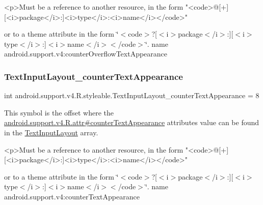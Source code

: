 \begin{DoxyVerb}      <p>Must be a reference to another resource, in the form "<code>@[+][<i>package</i>:]<i>type</i>:<i>name</i></code>"
\end{DoxyVerb}
 or to a theme attribute in the form \char`\"{}$<$code$>$?\mbox{[}$<$i$>$package$<$/i$>$\+:\mbox{]}\mbox{[}$<$i$>$type$<$/i$>$\+:\mbox{]}$<$i$>$name$<$/i$>$$<$/code$>$\char`\"{}.  name android.\+support.\+v4\+:counter\+Overflow\+Text\+Appearance \mbox{\label{classandroid_1_1support_1_1v4_1_1R_1_1styleable_aeb2a80f0f76cdaa1ff3b2b05d42b6356}} 
\subsubsection{\texorpdfstring{Text\+Input\+Layout\+\_\+counter\+Text\+Appearance}{TextInputLayout\_counterTextAppearance}}
{\footnotesize\ttfamily int android.\+support.\+v4.\+R.\+styleable.\+Text\+Input\+Layout\+\_\+counter\+Text\+Appearance = 8\hspace{0.3cm}{\ttfamily [static]}}

This symbol is the offset where the \hyperlink{classandroid_1_1support_1_1v4_1_1R_1_1attr_acb70339edeae49ae1b37939e05cf1d9a}{android.\+support.\+v4.\+R.\+attr\#counter\+Text\+Appearance} attribute\textquotesingle{}s value can be found in the \hyperlink{classandroid_1_1support_1_1v4_1_1R_1_1styleable_a86943debf88d7a9dc4c0627a8546913d}{Text\+Input\+Layout} array.

\begin{DoxyVerb}      <p>Must be a reference to another resource, in the form "<code>@[+][<i>package</i>:]<i>type</i>:<i>name</i></code>"
\end{DoxyVerb}
 or to a theme attribute in the form \char`\"{}$<$code$>$?\mbox{[}$<$i$>$package$<$/i$>$\+:\mbox{]}\mbox{[}$<$i$>$type$<$/i$>$\+:\mbox{]}$<$i$>$name$<$/i$>$$<$/code$>$\char`\"{}.  name android.\+support.\+v4\+:counter\+Text\+Appearance \mbox{\label{classandroid_1_1support_1_1v4_1_1R_1_1styleable_a1524c63d3a980ad9efb17c1c648871c2}} 
